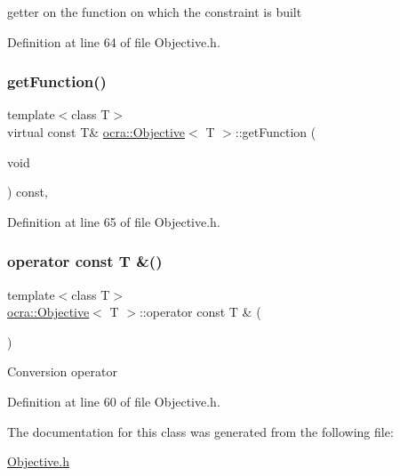 getter on the function on which the constraint is built 

Definition at line 64 of file Objective.\+h.

\hypertarget{classocra_1_1Objective_a724137e4282c67586ce8b51a5b57845e}{}\label{classocra_1_1Objective_a724137e4282c67586ce8b51a5b57845e} 
\subsubsection{\texorpdfstring{get\+Function()}{getFunction()}\hspace{0.1cm}{\footnotesize\ttfamily [2/2]}}
{\footnotesize\ttfamily template$<$class T$>$ \\
virtual const T\& \hyperlink{classocra_1_1Objective}{ocra\+::\+Objective}$<$ T $>$\+::get\+Function (\begin{DoxyParamCaption}\item[{void}]{ }\end{DoxyParamCaption}) const\hspace{0.3cm}{\ttfamily [inline]}, {\ttfamily [virtual]}}



Definition at line 65 of file Objective.\+h.

\hypertarget{classocra_1_1Objective_adde3288cc5ad20394a3558c9b8092b71}{}\label{classocra_1_1Objective_adde3288cc5ad20394a3558c9b8092b71} 
\subsubsection{\texorpdfstring{operator const T \&()}{operator const T \&()}}
{\footnotesize\ttfamily template$<$class T$>$ \\
\hyperlink{classocra_1_1Objective}{ocra\+::\+Objective}$<$ T $>$\+::operator const T \& (\begin{DoxyParamCaption}{ }\end{DoxyParamCaption})\hspace{0.3cm}{\ttfamily [inline]}}

Conversion operator 

Definition at line 60 of file Objective.\+h.



The documentation for this class was generated from the following file\+:\begin{DoxyCompactItemize}
\item 
\hyperlink{Objective_8h}{Objective.\+h}\end{DoxyCompactItemize}
